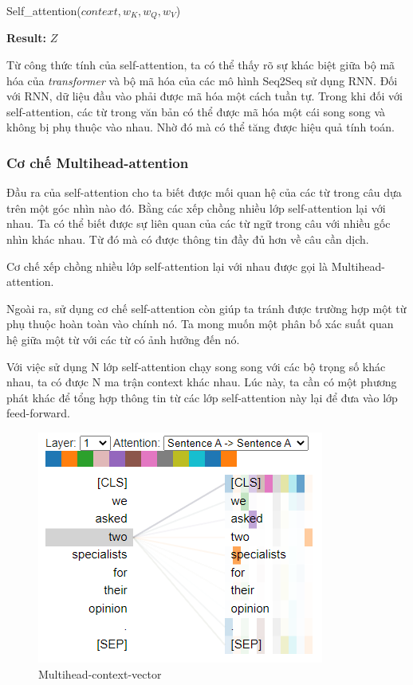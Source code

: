 \begin{algorithm}[H]
    \caption{Self\_attention($context, w_K, w_Q, w_V$)}
    \begin{algorithmic}[1]
		\State \textbf{Result:} $Z$
    \end{algorithmic}
\end{algorithm}

Từ công thức tính của self-attention, ta có thể thấy rõ sự khác biệt giữa bộ mã hóa của  \textit{transformer}  và bộ mã hóa của các mô hình Seq2Seq sử dụng RNN. Đối với RNN, dữ liệu đầu vào phải được mã hóa một cách tuần tự. Trong khi đối với self-attention, các từ trong văn bản có thể được mã hóa một cái song song và không bị phụ thuộc vào nhau. Nhờ đó mà có thể tăng được hiệu quả tính toán.

\subsubsection{Cơ chế Multihead-attention}
Đầu ra của self-attention cho ta biết được mối quan hệ của các từ trong câu dựa trên một góc nhìn nào đó. Bằng các xếp chồng nhiều lớp self-attention lại với nhau. Ta có thể biết được sự liên quan của các từ ngữ trong câu với nhiều gốc nhìn khác nhau. Từ đó mà có được thông tin đầy đủ hơn về câu cần dịch. 

Cơ chế xếp chồng nhiều lớp self-attention lại với nhau được gọi là Multihead-attention. 

Ngoài ra, sử dụng cơ chế self-attention còn giúp ta tránh được trường hợp một từ phụ thuộc hoàn toàn vào chính nó. Ta mong muốn một phân bố xác suất quan hệ giữa một từ với các từ có ảnh hưởng đến nó.

Với việc sử dụng N lớp self-attention chạy song song với các bộ trọng số khác nhau, ta có được N ma trận context khác nhau. Lúc này, ta cần có một phương phát khác để tổng hợp thông tin từ các lớp self-attention này lại để đưa vào lớp feed-forward. 

\begin{figure}[H]
    \begin{center}
        \includegraphics[scale=0.8]{images/multihead-context-vector}
        \caption{Multihead-context-vector}
        \label{fig:multihead-context-vector}
    \end{center}
\end{figure}

